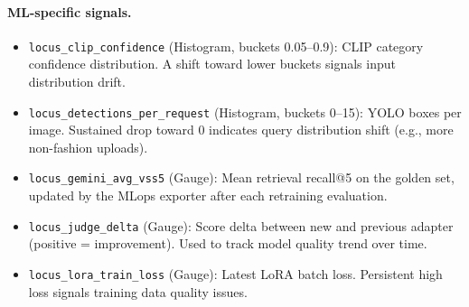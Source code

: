 \documentclass[12pt]{article}
\begin{document}
\begin{table}[H]
\centering
\small
\setlength{\tabcolsep}{3pt}
\caption{Per-service observability signals. Latency histograms expose p50 and p95 via Prometheus \texttt{histogram\_quantile()}.}
\label{tab:per-service-metrics}
\end{table}

\paragraph{ML-specific signals.}
\begin{itemize}[leftmargin=*, itemsep=2pt]
    \item \texttt{locus\_clip\_confidence} (Histogram, buckets 0.05--0.9): CLIP category confidence distribution. A shift toward lower buckets signals input distribution drift.
    \item \texttt{locus\_detections\_per\_request} (Histogram, buckets 0--15): YOLO boxes per image. Sustained drop toward 0 indicates query distribution shift (e.g., more non-fashion uploads).
    \item \texttt{locus\_gemini\_avg\_vss5} (Gauge): Mean retrieval recall@5 on the golden set, updated by the MLops exporter after each retraining evaluation.
    \item \texttt{locus\_judge\_delta} (Gauge): Score delta between new and previous adapter (positive = improvement). Used to track model quality trend over time.
    \item \texttt{locus\_lora\_train\_loss} (Gauge): Latest LoRA batch loss. Persistent high loss signals training data quality issues.
\end{itemize}
\end{document}
